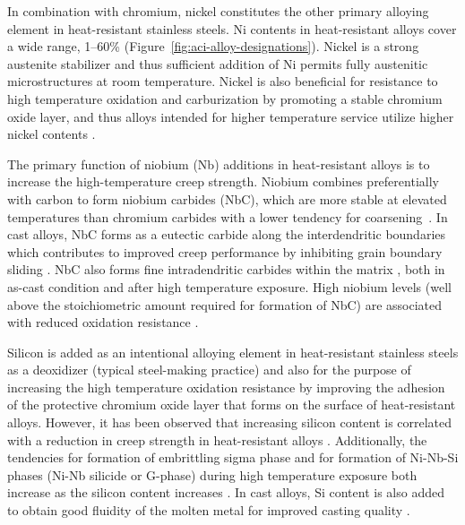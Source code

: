 In combination with chromium, nickel constitutes the other primary alloying element in heat-resistant stainless steels. Ni contents in heat-resistant alloys cover a wide range, \numrange[range-phrase=--]{1}{60}\% (Figure~\ref{fig:aci-alloy-designations}). Nickel is a strong austenite stabilizer \cite{folkhard_welding_1988} and thus sufficient addition of Ni permits fully austenitic microstructures at room temperature. Nickel is also beneficial for resistance to high temperature oxidation and carburization by promoting a stable chromium oxide layer, and thus alloys intended for higher temperature service utilize higher nickel contents \cite{kane_evolution_1991}.

The primary function of niobium (Nb) additions in heat-resistant alloys is to increase the high-temperature creep strength. Niobium combines preferentially with carbon to form niobium carbides (NbC), which are more stable at elevated temperatures than chromium carbides with a lower tendency for coarsening~\cite{keown_niobium_1981}. In cast alloys, NbC forms as a eutectic carbide along the interdendritic boundaries \cite{davis_metallurgy_1994} which contributes to improved creep performance by inhibiting grain boundary sliding \cite{de_almeida_soares_niobium_1992-1}. NbC also forms fine intradendritic carbides within the matrix \cite{chen_characterisation_2004}, both in as-cast condition and after high temperature exposure. High niobium levels (well above the stoichiometric amount required for formation of NbC) are associated with reduced oxidation resistance \cite{collins_effect_1980}.

Silicon is added as an intentional alloying element in heat-resistant stainless steels as a deoxidizer (typical steel-making practice) and also for the purpose of increasing the high temperature oxidation resistance \cite{kane_evolution_1991} by improving the adhesion of the protective chromium oxide layer that forms on the surface of heat-resistant alloys. However, it has been observed that increasing silicon content is correlated with a reduction in creep strength in heat-resistant alloys \cite{avery_cast_1969}. Additionally, the tendencies for formation of embrittling sigma phase and for formation of Ni-Nb-Si phases (Ni-Nb silicide or G-phase) during high temperature exposure both increase as the silicon content increases \cite{pedro_ibanez_effects_1993,davis_metallurgy_1994}. In cast alloys, Si content is also added to obtain good fluidity of the molten metal for improved casting quality \cite{blair_cast_stainless_1990}.

